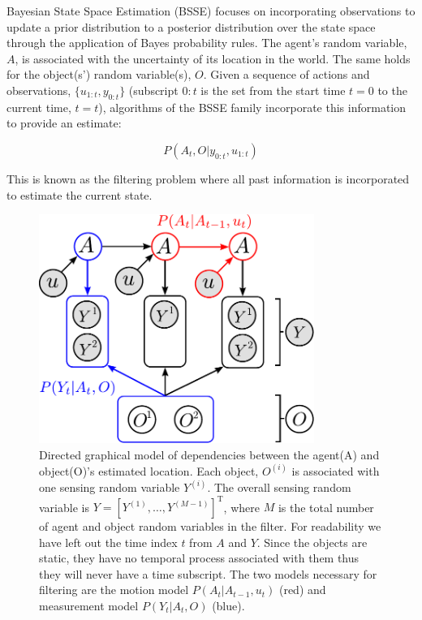 Bayesian State Space Estimation (BSSE) focuses on incorporating observations to update a prior distribution to a posterior distribution 
over the state space through the application of Bayes probability rules. The agent's random variable, $A$, 
is associated with the uncertainty of its location in the world. The same holds for the object(s') random variable(s), $O$. 
Given a sequence of actions and observations, $\{u_{1:t},y_{0:t}\}$ (subscript $0:t$ is the set from the start time $t=0$ to the current time, $t=t$), 
algorithms of the BSSE family incorporate this information to provide an estimate:

\begin{equation}
 P(A_t,O|y_{0:t},u_{1:t}) 
 \label{eq:joint}
\end{equation}

This is known as the filtering problem where all past information is incorporated to estimate the current state.  

\begin{figure}
\centering
\includegraphics[width=0.8\textwidth]{./ch5-MLMF/Figures/Figure2.pdf}
\caption{Directed graphical model of dependencies between the agent(A) and object(O)'s estimated location. Each 
object, $O^{(i)}$ is associated with one sensing random variable $Y^{(i)}$. The overall sensing random variable is $Y = \left[Y^{(1)},\dots,Y^{(M-1)}\right]^{\mathrm{T}}$,
where $M$ is the total number of agent and object random variables in the filter. 
For readability we have left out the time index $t$ from $A$ and $Y$. Since the objects are static, they have no temporal process associated with 
them thus they will never have a time subscript. The two models necessary for filtering are the motion model $P(A_t|A_{t-1},u_t)$ (red) and measurement model
$P(Y_t|A_t,O)$ (blue).}
\label{fig:bayesian_sse_dag}
\end{figure}

